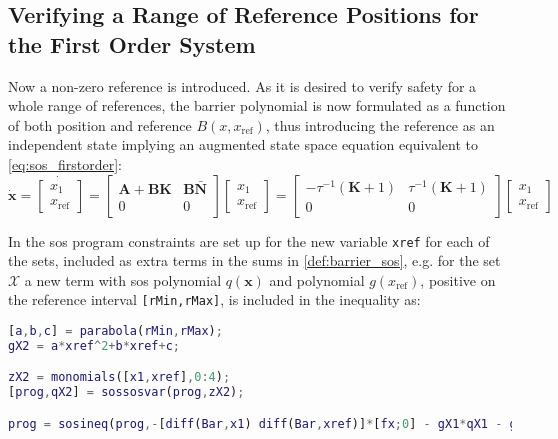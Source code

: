 \subsection{Verifying a Range of Reference Positions for the First Order System}\label{sec:sos_1storder_references}

Now a non-zero reference is introduced. As it is desired to verify safety for a whole range of references, the barrier polynomial is now formulated as a function of both position and reference $B(x,x_\text{ref})$, thus introducing the reference as an independent state implying an augmented state space equation equivalent to \autoref{eq:sos_firstorder}: 
\begin{equation}
\dot{\mathbf{x}}=\dot{\begin{bmatrix}
x_1\\x_\text{ref}
\end{bmatrix}} 
= \begin{bmatrix}
\mathbf{A}+\textbf{BK} & \textbf{B}\bar{\mathbf{N}}\\
0 & 0
\end{bmatrix}
\begin{bmatrix}
x_1\\x_\text{ref}
\end{bmatrix}
= \begin{bmatrix}
-\tau^{-1}(\mathbf{K}+1) & \tau^{-1}(\mathbf{K}+1)\\
0 & 0
\end{bmatrix}
\begin{bmatrix}
x_1\\x_\text{ref}
\end{bmatrix}
\label{eq:1storder_augmented}
\end{equation}

In the \gls{sos} program constraints are set up for the new variable \texttt{xref}  for each of the sets, included as extra terms in the sums in \autoref{def:barrier_sos}, e.g. for the set $\mathcal{X}$ a new term with \gls{sos} polynomial $q(\mathbf{x})$ and polynomial $g(x_\text{ref})$, positive on the  reference  interval \texttt{[rMin,rMax]}, is included in the inequality as:
\begin{lstlisting}[language=matlab]
% Constraint on the set X being nonpositive for the interval of references 
[a,b,c] = parabola(rMin,rMax); 
gX2 = a*xref^2+b*xref+c;

zX2 = monomials([x1,xref],0:4);
[prog,qX2] = sossosvar(prog,zX2);

prog = sosineq(prog,-[diff(Bar,x1) diff(Bar,xref)]*[fx;0] - gX1*qX1 - gX2*qX2);
\end{lstlisting}

